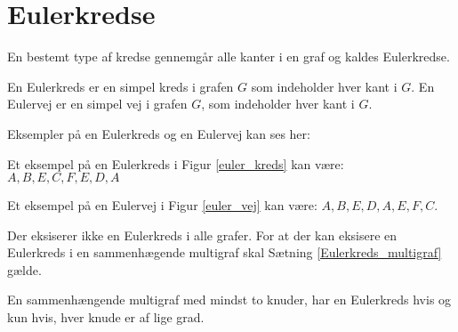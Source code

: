 \section{Eulerkredse}

En bestemt type af kredse gennemgår alle kanter i en graf og kaldes Eulerkredse. 

\begin{defn}\label{euler_def}
	En Eulerkreds er en simpel kreds i grafen $G$ som indeholder hver kant i $G$.
	En Eulervej er en simpel vej i grafen $G$, som indeholder hver kant i $G$.  
\end{defn}

\begin{exmp}
	Eksempler på en Eulerkreds og en Eulervej kan ses her: 
\end{exmp}



Et eksempel på en Eulerkreds i Figur \ref{euler_kreds} kan være: $A,B,E,C,F,E,D,A$



Et eksempel på en Eulervej i Figur \ref{euler_vej} kan være: $A,B,E,D,A,E,F,C$.

Der eksiserer ikke en Eulerkreds i alle grafer.
For at der kan eksisere en Eulerkreds i en sammenhægende multigraf skal Sætning \ref{Eulerkreds_multigraf} gælde. 

\begin{thm}\label{Eulerkreds_multigraf}
	En sammenhængende multigraf med mindst to knuder, har en Eulerkreds hvis og kun hvis, hver knude er af lige grad.
\end{thm}

